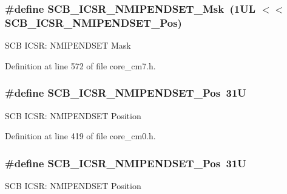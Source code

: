 \subsubsection[{\texorpdfstring{S\+C\+B\+\_\+\+I\+C\+S\+R\+\_\+\+N\+M\+I\+P\+E\+N\+D\+S\+E\+T\+\_\+\+Msk}{SCB_ICSR_NMIPENDSET_Msk}}]{\setlength{\rightskip}{0pt plus 5cm}\#define S\+C\+B\+\_\+\+I\+C\+S\+R\+\_\+\+N\+M\+I\+P\+E\+N\+D\+S\+E\+T\+\_\+\+Msk~(1\+U\+L $<$$<$ S\+C\+B\+\_\+\+I\+C\+S\+R\+\_\+\+N\+M\+I\+P\+E\+N\+D\+S\+E\+T\+\_\+\+Pos)}\hypertarget{group___c_m_s_i_s___s_c_b_ga340e3f79e9c3607dee9f2c048b6b22e8}{}\label{group___c_m_s_i_s___s_c_b_ga340e3f79e9c3607dee9f2c048b6b22e8}
S\+CB I\+C\+SR\+: N\+M\+I\+P\+E\+N\+D\+S\+ET Mask 

Definition at line 572 of file core\+\_\+cm7.\+h.

\subsubsection[{\texorpdfstring{S\+C\+B\+\_\+\+I\+C\+S\+R\+\_\+\+N\+M\+I\+P\+E\+N\+D\+S\+E\+T\+\_\+\+Pos}{SCB_ICSR_NMIPENDSET_Pos}}]{\setlength{\rightskip}{0pt plus 5cm}\#define S\+C\+B\+\_\+\+I\+C\+S\+R\+\_\+\+N\+M\+I\+P\+E\+N\+D\+S\+E\+T\+\_\+\+Pos~31U}\hypertarget{group___c_m_s_i_s___s_c_b_ga750d4b52624a46d71356db4ea769573b}{}\label{group___c_m_s_i_s___s_c_b_ga750d4b52624a46d71356db4ea769573b}
S\+CB I\+C\+SR\+: N\+M\+I\+P\+E\+N\+D\+S\+ET Position 

Definition at line 419 of file core\+\_\+cm0.\+h.

\subsubsection[{\texorpdfstring{S\+C\+B\+\_\+\+I\+C\+S\+R\+\_\+\+N\+M\+I\+P\+E\+N\+D\+S\+E\+T\+\_\+\+Pos}{SCB_ICSR_NMIPENDSET_Pos}}]{\setlength{\rightskip}{0pt plus 5cm}\#define S\+C\+B\+\_\+\+I\+C\+S\+R\+\_\+\+N\+M\+I\+P\+E\+N\+D\+S\+E\+T\+\_\+\+Pos~31U}\hypertarget{group___c_m_s_i_s___s_c_b_ga750d4b52624a46d71356db4ea769573b}{}\label{group___c_m_s_i_s___s_c_b_ga750d4b52624a46d71356db4ea769573b}
S\+CB I\+C\+SR\+: N\+M\+I\+P\+E\+N\+D\+S\+ET Position 

